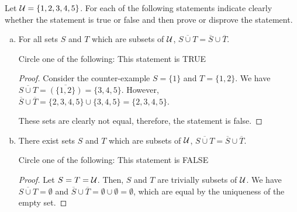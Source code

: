 \documentclass{agony}
\begin{document}
\question Let $\mathcal{U}=\{1,2,3,4,5\}$.
For each of the following statements indicate clearly whether the statement is
true or false and then prove or disprove the statement.
\begin{enumerate}[(a)]
  \item For all sets $S$ and $T$ which are subsets of $\mathcal{U}$, $\overline{S\cup T}=\overline{S}\cup\overline{T}$.

        Circle one of the following:
        \quad This statement is TRUE
        \quad {}

        \begin{proof}
          Consider the counter-example $S=\{1\}$ and $T=\{1,2\}$.
          We have $\overline{S\cup T} = \overline{(\{1,2\})} = \{3,4,5\}$.
          However, $\overline{S}\cup\overline{T} = \{2,3,4,5\} \cup \{3,4,5\} = \{2,3,4,5\}$.

          These sets are clearly not equal, therefore, the statement is false.
        \end{proof}
  \item There exist sets $S$ and $T$ which are subsets of $\mathcal{U}$, $\overline{S\cup T}=\overline{S}\cup\overline{T}$.

        Circle one of the following:
        \quad {}
        \quad This statement is FALSE

        \begin{proof}
          Let $S=T=\mathcal{U}$. Then, $S$ and $T$ are trivially subsets of $\mathcal{U}$.
          We have $\overline{S\cup T} = \emptyset$ and
          $\overline{S}\cup\overline{T}=\emptyset\cup\emptyset=\emptyset$,
          which are equal by the uniqueness of the empty set.
        \end{proof}
\end{enumerate}
\end{document}
